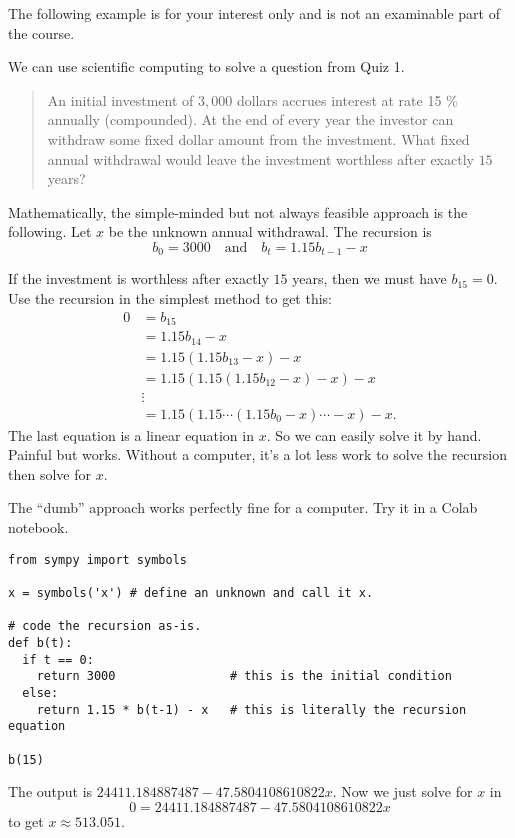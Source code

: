 \documentclass[../main.tex]{subfiles}
\begin{document}
The following example is for your interest only and is not an examinable part of the course. 
\begin{computing}
  We can use scientific computing to solve a question from Quiz 1.

  \begin{quote}
    An initial investment of \(3,000\) dollars accrues interest at rate 15 \% annually (compounded). At the end of every year the investor can withdraw some fixed dollar amount from the investment. What fixed annual withdrawal would leave the investment worthless after exactly \(15\) years?
  \end{quote}

  Mathematically, the simple-minded but not always feasible approach is the following.  Let \(x\) be the unknown annual withdrawal. The recursion is
  \[
    b_{0} = 3000 \quad\text{and}\quad b_{t} = 1.15 b_{t-1} - x
  \]

  If the investment is worthless after exactly \(15\) years, then we must have \(b_{15} = 0\). Use the recursion in the simplest method to get this:
  \begin{align*}
    0 & = b_{15} \\
      &= 1.15 b_{14} - x \\
      &= 1.15 (1.15 b_{13} - x) - x \\
      &= 1.15 (1.15 (1.15 b_{12} - x)  - x) - x \\
      &\vdots \\
      &= 1.15 (1.15 \cdots (1.15 b_{0} - x) \cdots - x) - x.
  \end{align*}
  The last equation is a linear equation in \(x\). So we can easily solve it by hand. Painful but works.  Without a computer, it's a lot less work to solve the recursion then solve for \(x\). 

  The ``dumb'' approach works perfectly fine for a computer.  Try it in a Colab notebook.
  \begin{verbatim}
from sympy import symbols

x = symbols('x') # define an unknown and call it x.

# code the recursion as-is.
def b(t):
  if t == 0:
    return 3000                # this is the initial condition
  else:
    return 1.15 * b(t-1) - x   # this is literally the recursion equation 

b(15)
  \end{verbatim}
  The output is \(24411.184887487−47.5804108610822x\). Now we just solve for \(x\) in \[0 = 24411.184887487−47.5804108610822x\]
  to get \(x \approx 513.051\). 
\end{computing}
\end{document}
